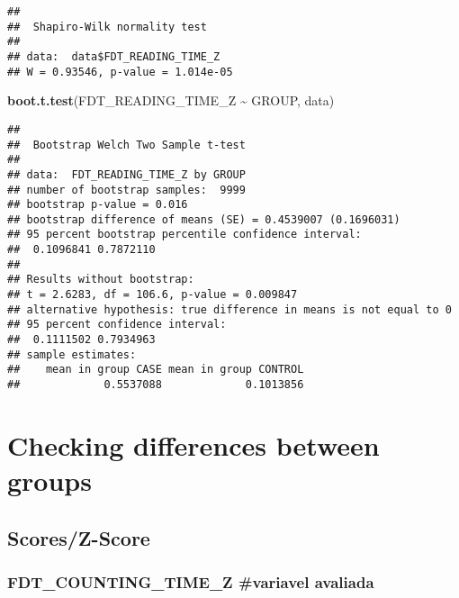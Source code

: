\documentclass[
]{article}
\newenvironment{Shaded}{\begin{snugshade}}{\end{snugshade}}
\newcommand{\FunctionTok}[1]{\textcolor[rgb]{0.13,0.29,0.53}{\textbf{#1}}}
\newcommand{\NormalTok}[1]{#1}
\newcommand{\SpecialCharTok}[1]{\textcolor[rgb]{0.81,0.36,0.00}{\textbf{#1}}}
\begin{document}
\begin{Shaded}
\end{Shaded}

\begin{verbatim}
## 
##  Shapiro-Wilk normality test
## 
## data:  data$FDT_READING_TIME_Z
## W = 0.93546, p-value = 1.014e-05
\end{verbatim}

\begin{Shaded}
\begin{Highlighting}[]
\FunctionTok{boot.t.test}\NormalTok{(FDT\_READING\_TIME\_Z }\SpecialCharTok{\textasciitilde{}}\NormalTok{ GROUP, data)}
\end{Highlighting}
\end{Shaded}

\begin{verbatim}
## 
##  Bootstrap Welch Two Sample t-test
## 
## data:  FDT_READING_TIME_Z by GROUP
## number of bootstrap samples:  9999
## bootstrap p-value = 0.016 
## bootstrap difference of means (SE) = 0.4539007 (0.1696031) 
## 95 percent bootstrap percentile confidence interval:
##  0.1096841 0.7872110
## 
## Results without bootstrap:
## t = 2.6283, df = 106.6, p-value = 0.009847
## alternative hypothesis: true difference in means is not equal to 0
## 95 percent confidence interval:
##  0.1111502 0.7934963
## sample estimates:
##    mean in group CASE mean in group CONTROL 
##             0.5537088             0.1013856
\end{verbatim}

\section{\texorpdfstring{\textbf{Checking differences between
groups}}{Checking differences between groups}}\label{checking-differences-between-groups-5}

\subsection{\texorpdfstring{\textbf{Scores/Z-Score}}{Scores/Z-Score}}\label{scoresz-score-5}

\subsubsection{FDT\_COUNTING\_TIME\_Z \#variavel
avaliada}\label{fdt_counting_time_z-variavel-avaliada}
\end{document}
